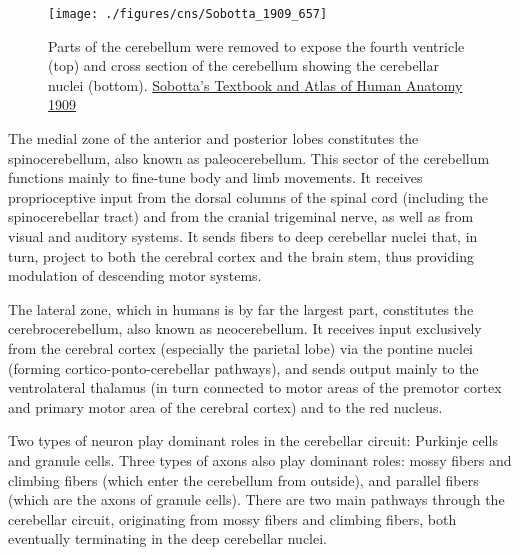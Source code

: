 \begin{figure}

{\centering \texttt{[image: ./figures/cns/Sobotta\_1909\_657]} 

}

\caption{Parts of the cerebellum were removed to expose the fourth ventricle (top) and cross section of the cerebellum showing the cerebellar nuclei (bottom). \href{https://commons.wikimedia.org/wiki/File:Sobo_1909_655.png}{Sobotta's Textbook and Atlas of Human Anatomy 1909}}\label{fig:cerebellumcut}
\end{figure}

The medial zone of the anterior and posterior lobes constitutes the spinocerebellum, also known as paleocerebellum. This sector of the cerebellum functions mainly to fine-tune body and limb movements. It receives proprioceptive input from the dorsal columns of the spinal cord (including the spinocerebellar tract) and from the cranial trigeminal nerve, as well as from visual and auditory systems. It sends fibers to deep cerebellar nuclei that, in turn, project to both the cerebral cortex and the brain stem, thus providing modulation of descending motor systems.

The lateral zone, which in humans is by far the largest part, constitutes the cerebrocerebellum, also known as neocerebellum. It receives input exclusively from the cerebral cortex (especially the parietal lobe) via the pontine nuclei (forming cortico-ponto-cerebellar pathways), and sends output mainly to the ventrolateral thalamus (in turn connected to motor areas of the premotor cortex and primary motor area of the cerebral cortex) and to the red nucleus.

Two types of neuron play dominant roles in the cerebellar circuit: Purkinje cells and granule cells. Three types of axons also play dominant roles: mossy fibers and climbing fibers (which enter the cerebellum from outside), and parallel fibers (which are the axons of granule cells). There are two main pathways through the cerebellar circuit, originating from mossy fibers and climbing fibers, both eventually terminating in the deep cerebellar nuclei.



